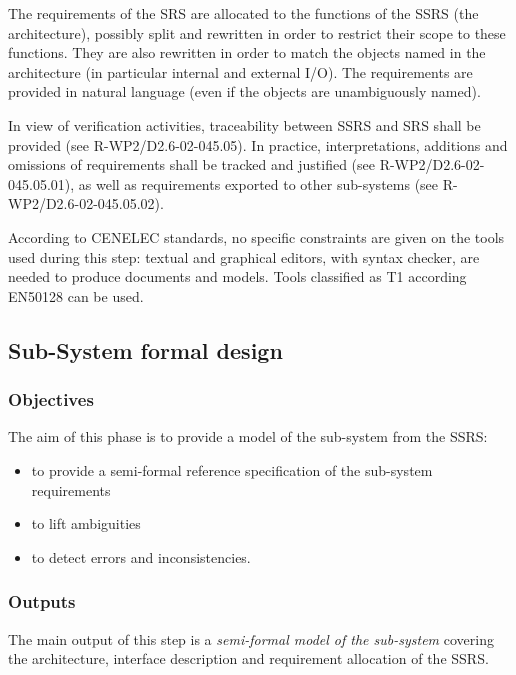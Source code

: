 The requirements of the SRS are allocated to the
functions of the SSRS (the architecture), possibly split and rewritten in order to restrict their scope to these
functions. They are also rewritten in order to match the objects named in
the architecture (in particular internal and external I/O). The requirements are provided in natural language
(even if the objects are unambiguously named).

In view of verification activities, traceability between SSRS and SRS shall be provided (see R-WP2/D2.6-02-045.05). In practice, interpretations, additions and omissions of requirements shall be tracked and justified (see R-WP2/D2.6-02-045.05.01), as well as requirements exported to other sub-systems (see R-WP2/D2.6-02-045.05.02).

According to  CENELEC standards, no specific constraints are given on the tools used during this step: textual and graphical editors, with syntax checker, are needed to  produce documents and models. Tools classified as T1 according EN50128 can be used.


\subsection{Sub-System formal design}
\label{sec:subsyst-formal-design}



\subsubsection{Objectives}
\label{sec:sys-fm-objective}

The aim of this phase is to provide a model of the sub-system from the SSRS:

\begin{itemize}
\item to provide a semi-formal reference specification of the sub-system requirements
\item to lift ambiguities
\item to detect errors and inconsistencies.
\end{itemize}


\subsubsection{Outputs}
\label{sec:sys-fm-outputs}


The main output of this step is a \textit{semi-formal model of the sub-system}  covering the architecture, interface description and requirement allocation of the SSRS.

